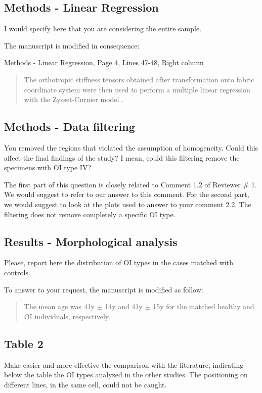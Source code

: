\documentclass{AR2RC}
\begin{document}
\subsection{Methods - Linear Regression}
\RC I would specify here that you are considering the entire sample.

\AR The manuscript is modified in consequence:\par

Methods - Linear Regression, Page 4, Lines 47-48, Right column
\begin{quote}
	The orthotropic stiffness tensors obtained after transformation onto fabric coordinate system were then used to perform a multiple linear regression with the Zysset-Curnier model .
\end{quote}

\subsection{Methods - Data filtering}
\RC You removed the regions that violated the assumption of homogeneity. Could this affect the final findings of the study? I mean, could this filtering remove the specimens with OI type IV?

\AR The first part of this question is closely related to Comment 1.2 of Reviewer \# 1. We would suggest to refer to our answer to this comment. For the second part, we would suggest to look at the plots used to answer to your comment 2.2. The filtering does not remove completely a specific OI type.

\subsection{Results - Morphological analysis}
\RC Please, report here the distribution of OI types in the cases matched with controls.

\AR To answer to your request, the manuscript is modified as follow:
\begin{quote}
	The mean age was 41y $\pm$ 14y and 41y $\pm$ 15y for the matched healthy and OI individuals, respectively. 
\end{quote}


\subsection{Table 2}
\RC Make easier and more effective the comparison with the literature, indicating below the table the OI types analyzed in the other studies. The positioning on different lines, in the same cell, could not be caught.
\end{document}
